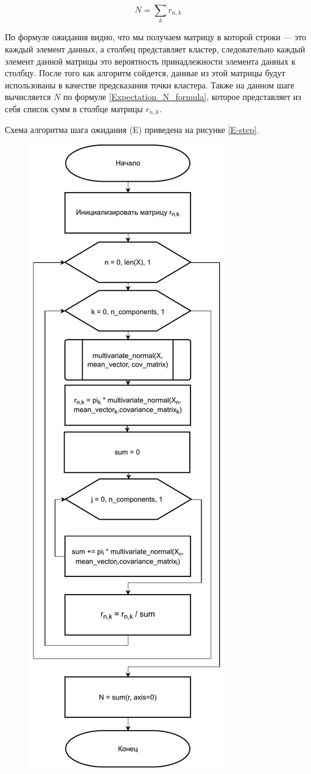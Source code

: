 \begin{equation}
\label{Expectation_N_formula}
N = \sum_{k}r_{n,k}
\end{equation}

По формуле ожидания видно, что мы получаем матрицу в которой строки --- это каждый элемент данных, а столбец представляет кластер, следовательно каждый элемент данной матрицы это вероятность принадлежности элемента данных к столбцу. После того как алгоритм сойдется, данные из этой матрицы будут использованы в качестве предсказания точки кластера. Также на данном шаге вычисляется $N$ по формуле \ref{Expectation_N_formula}, которое представляет из себя список сумм в столбце матрицы $r_{n,k}$.

Схема алгоритма шага ожидания (E) приведена на рисунке \ref{E-step}.

\begin{figure}[H]
	\centering
	\includegraphics[scale=0.75]{img/E-step.pdf}

\end{figure}

